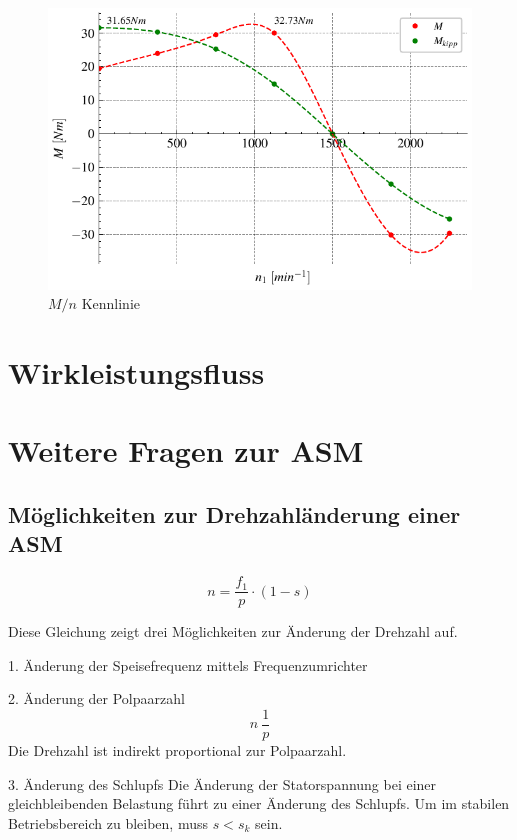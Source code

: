 \documentclass[conference]{IEEEtran}
\begin{document}
\begin{figure}[htbp]
    \centering
    \includegraphics[width=\columnwidth]{./figures/m_n-kennlinie.pdf}
    \caption{$M/n$ Kennlinie}
    \label{fig:m_n-kennlinie}
\end{figure}


\section{Wirkleistungsfluss}

\section{Weitere Fragen zur ASM}

\subsection{Möglichkeiten zur Drehzahländerung einer ASM}

\begin{equation}
  n = \frac{f_{1}}{p} \cdot (1-s)
\end{equation}

Diese Gleichung zeigt drei Möglichkeiten zur Änderung der Drehzahl auf.

1. Änderung der Speisefrequenz mittels Frequenzumrichter

2. Änderung der Polpaarzahl
\begin{equation}
    n ~ \frac{1}{p}
\end{equation}
Die Drehzahl ist indirekt proportional zur Polpaarzahl.

3. Änderung des Schlupfs
Die Änderung der Statorspannung bei einer gleichbleibenden Belastung führt zu einer Änderung
des Schlupfs. Um im stabilen Betriebsbereich zu bleiben, muss $s<s_{k}$ sein. 
\end{document}
